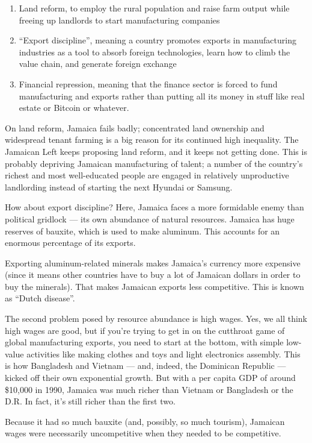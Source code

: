 \documentclass[
]{book}
\begin{document}
\begin{enumerate}
\def\labelenumi{\arabic{enumi}.}
\item
  Land reform, to employ the rural population and raise farm output while freeing up landlords to start manufacturing companies
\item
  ``Export discipline'', meaning a country promotes exports in manufacturing industries as a tool to absorb foreign technologies, learn how to climb the value chain, and generate foreign exchange
\item
  Financial repression, meaning that the finance sector is forced to fund manufacturing and exports rather than putting all its money in stuff like real estate or Bitcoin or whatever.
\end{enumerate}

On land reform, Jamaica fails badly; concentrated land ownership and widespread tenant farming is a big reason for its continued high inequality. The Jamaican Left keeps proposing land reform, and it keeps not getting done. This is probably depriving Jamaican manufacturing of talent; a number of the country's richest and most well-educated people are engaged in relatively unproductive landlording instead of starting the next Hyundai or Samsung.

How about export discipline? Here, Jamaica faces a more formidable enemy than political gridlock --- its own abundance of natural resources. Jamaica has huge reserves of bauxite, which is used to make aluminum. This accounts for an enormous percentage of its exports.

Exporting aluminum-related minerals makes Jamaica's currency more expensive (since it means other countries have to buy a lot of Jamaican dollars in order to buy the minerals). That makes Jamaican exports less competitive. This is known as ``Dutch disease''.

The second problem posed by resource abundance is high wages. Yes, we all think high wages are good, but if you're trying to get in on the cutthroat game of global manufacturing exports, you need to start at the bottom, with simple low-value activities like making clothes and toys and light electronics assembly. This is how Bangladesh and Vietnam --- and, indeed, the Dominican Republic --- kicked off their own exponential growth. But with a per capita GDP of around \$10,000 in 1990, Jamaica was much richer than Vietnam or Bangladesh or the D.R. In fact, it's still richer than the first two.

Because it had so much bauxite (and, possibly, so much tourism), Jamaican wages were necessarily uncompetitive when they needed to be competitive.
\end{document}
